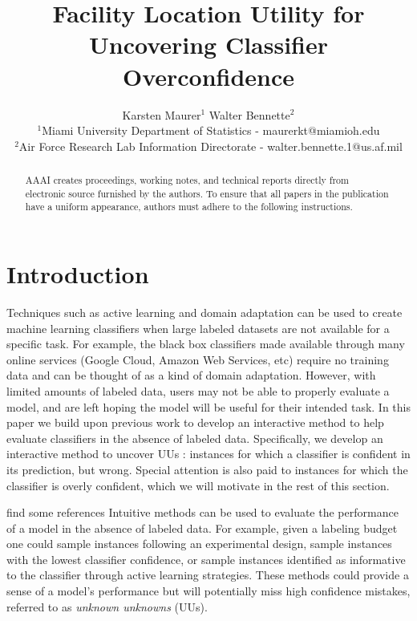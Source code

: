 \documentclass[letterpaper]{article} %
\newcommand{\wdb}[1]{{\color{blue} #1}} %
\begin{document}
%
\title{Facility Location Utility for Uncovering Classifier Overconfidence}
\author{Karsten Maurer$^1$ \hspace{.2in} Walter Bennette$^2$\\
$^1$Miami University Department of Statistics - maurerkt@miamioh.edu\\ 
$^2$Air Force Research Lab Information Directorate - walter.bennette.1@us.af.mil \\
}

\maketitle
\begin{abstract}
AAAI creates proceedings, working notes, and technical reports directly from electronic source furnished by the authors. To ensure that all papers in the publication have a uniform appearance, authors must adhere to the following instructions. 
\end{abstract}

\section{Introduction}

Techniques such as active learning \citep{Settles2010} and domain adaptation \citep{Patel2014} can be used to create machine learning classifiers when large labeled datasets are not available for a specific task.  For example, the black box classifiers made available through many online services (Google Cloud, Amazon Web Services, etc) require no training data and can be thought of as a kind of domain adaptation.  However, with limited amounts of labeled data, users may not be able to properly evaluate a model, and are left hoping the model will be useful for their intended task.  In this paper we build upon previous work to develop an interactive method to help evaluate classifiers in the absence of labeled data.  Specifically, we develop an interactive method to uncover UUs \citep{Attenberg2015}: instances for which a classifier is confident in its prediction, but wrong. Special attention is also paid to instances for which the classifier is overly confident, which we will motivate in the rest of this section.

\wdb{find some references}  Intuitive methods can be used to evaluate the performance of a model in the absence of labeled data.  For example, given a labeling budget one could sample instances following an experimental design, sample instances with the lowest classifier confidence, or sample instances identified as informative to the classifier through active learning strategies.  These methods could provide a sense of a model's performance but will potentially miss high confidence mistakes, referred to as \textit{unknown unknowns} (UUs).     
\end{document}
